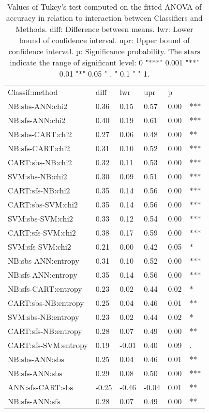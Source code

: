 \begin{table}[h]
\begin{center}
\begin{tabular}{|l|l|l|l|l|l}
\cline{1-5}
       Classif:method &   diff &    lwr &    upr &     p & \\
\cline{1-5}
      NB:sbs-ANN:chi2 &   0.36 &   0.15 &   0.57 &  0.00 &  *** \\
      NB:sfs-ANN:chi2 &   0.40 &   0.19 &   0.61 &  0.00 &  *** \\
     NB:sbs-CART:chi2 &   0.27 &   0.06 &   0.48 &  0.00 &   ** \\
     NB:sfs-CART:chi2 &   0.31 &   0.10 &   0.52 &  0.00 &  *** \\
     CART:sbs-NB:chi2 &   0.32 &   0.11 &   0.53 &  0.00 &  *** \\
      SVM:sbs-NB:chi2 &   0.30 &   0.09 &   0.51 &  0.00 &  *** \\
     CART:sfs-NB:chi2 &   0.35 &   0.14 &   0.56 &  0.00 &  *** \\
    CART:sbs-SVM:chi2 &   0.35 &   0.14 &   0.56 &  0.00 &  *** \\
     SVM:sbs-SVM:chi2 &   0.33 &   0.12 &   0.54 &  0.00 &  *** \\
    CART:sfs-SVM:chi2 &   0.38 &   0.17 &   0.59 &  0.00 &  *** \\
     SVM:sfs-SVM:chi2 &   0.21 &   0.00 &   0.42 &  0.05 &    * \\
   NB:sbs-ANN:entropy &   0.31 &   0.10 &   0.52 &  0.00 &  *** \\
   NB:sfs-ANN:entropy &   0.35 &   0.14 &   0.56 &  0.00 &  *** \\
  NB:sfs-CART:entropy &   0.23 &   0.02 &   0.44 &  0.02 &    * \\
  CART:sbs-NB:entropy &   0.25 &   0.04 &   0.46 &  0.01 &   ** \\
   SVM:sbs-NB:entropy &   0.23 &   0.02 &   0.44 &  0.02 &    * \\
  CART:sfs-NB:entropy &   0.28 &   0.07 &   0.49 &  0.00 &   ** \\
 CART:sfs-SVM:entropy &   0.19 &  -0.01 &   0.40 &  0.09 &    . \\
       NB:sbs-ANN:sbs &   0.25 &   0.04 &   0.46 &  0.01 &   ** \\
       NB:sfs-ANN:sbs &   0.29 &   0.08 &   0.50 &  0.00 &  *** \\
     ANN:sfs-CART:sbs &  -0.25 &  -0.46 &  -0.04 &  0.01 &   ** \\
       NB:sfs-ANN:sfs &   0.28 &   0.07 &   0.49 &  0.00 &   ** \\
\cline{1-5}
\end{tabular}
\caption{Values of Tukey's test computed on the fitted ANOVA of accuracy in relation to interaction between Classifiers and Methods. diff: Difference between means. lwr: Lower bound of confidence interval. upr: Upper bound of confidence interval. p: Significance probability. The stars indicate the range of significant level: 0 "***" 0.001 "**" 0.01 "*" 0.05 " . " 0.1 " " 1.}
\label{table:Tukey_values}
\end{center}
\end{table}
